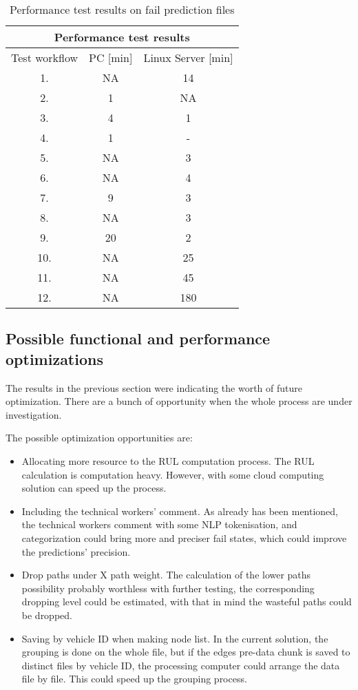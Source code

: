 \begin{table}[H]
\centering
\begin{tabular}{ |c|c|c|  }
\hline
\multicolumn{3}{|c|}{Performance test results} \\
\hline
Test workflow& PC [min] & Linux Server [min]\\
\hline
1.& NA & 14 \\
2.& 1 & NA \\
3.& 4 & 1 \\
4.& 1 & - \\
5.& NA & 3 \\
6.& NA & 4 \\
7.& 9 & 3 \\
8.& NA & 3 \\
9.& 20 & 2 \\
10.& NA & 25 \\
11.& NA & 45 \\
12.& NA & 180 \\
\hline
\end{tabular}
\caption{Performance test results on fail prediction files}
\label{table:3}
\end{table}
\subsection{Possible functional and performance optimizations}
The results in the previous section were indicating the worth of future optimization. There are a bunch of opportunity when the whole process are under investigation.

The possible optimization opportunities are:
\begin{itemize}
	\item{Allocating more resource to the RUL computation process.} The RUL calculation is computation heavy. However, with some cloud computing solution can speed up the process.
	\item{Including the technical workers' comment.} As already has been mentioned, the technical workers comment with some NLP tokenisation, and categorization could bring more and preciser fail states, which could improve the predictions' precision.
	\item{Drop paths under X path weight.} The calculation of the lower paths possibility probably worthless with further testing, the corresponding dropping level could be estimated, with that in mind the wasteful paths could be dropped.
	\item{Saving by vehicle ID when making node list.} In the current solution, the grouping is done on the whole file, but if the edges pre-data chunk is saved to distinct files by vehicle ID, the processing computer could arrange the data file by file. This could speed up the grouping process.
\end{itemize} 

